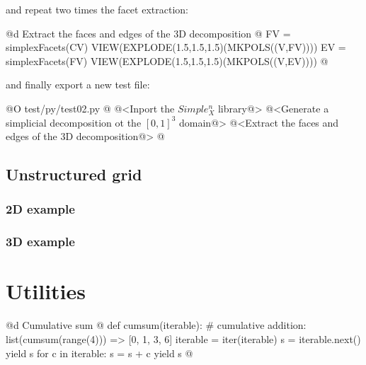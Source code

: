 \documentclass[11pt,oneside]{article}	%
\begin{document}
and repeat two times the facet extraction:

@d Extract the faces and edges of the 3D decomposition
@{
FV = simplexFacets(CV)
VIEW(EXPLODE(1.5,1.5,1.5)(MKPOLS((V,FV))))
EV = simplexFacets(FV)
VIEW(EXPLODE(1.5,1.5,1.5)(MKPOLS((V,EV))))
@}

and finally export a new test file:

@O test/py/test02.py 
@{
@<Inport the $Simple_X^n$ library@>
@<Generate a simplicial decomposition ot the $[0,1]^3$ domain@>
@<Extract the faces and edges of the 3D decomposition@>
@}


\subsection{Unstructured grid}


\subsubsection{2D example}


\subsubsection{3D example}


\appendix
\section{Utilities}


@d Cumulative sum
@{
def cumsum(iterable):
    # cumulative addition: list(cumsum(range(4))) => [0, 1, 3, 6]
    iterable = iter(iterable)
    s = iterable.next()
    yield s
    for c in iterable:
        s = s + c
        yield s
@}




\end{document}
